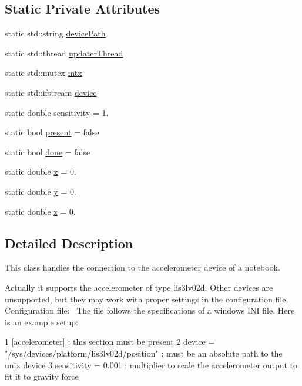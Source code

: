 \subsection*{Static Private Attributes}
\begin{DoxyCompactItemize}
\item 
static std\+::string \hyperlink{classAccelerometer_acb0857fa75bff055f25584ae24d362d4}{device\+Path}
\item 
static std\+::thread \hyperlink{classAccelerometer_a8b9d7d942de3ac41f6fe2b2c7e3f15e8}{updater\+Thread}
\item 
static std\+::mutex \hyperlink{classAccelerometer_aa5e00cbce6850be9d3083530bff709dd}{mtx}
\item 
static std\+::ifstream \hyperlink{classAccelerometer_adde7ddf4ba2fae34b4a0910f1a64076b}{device}
\item 
static double \hyperlink{classAccelerometer_a6c600b26e7eeb394058515e8481c8ae0}{sensitivity} = 1.
\item 
static bool \hyperlink{classAccelerometer_a3a11a04b74460eb6ddcf79af3a35e33b}{present} = false
\item 
static bool \hyperlink{classAccelerometer_abe36590009a1913b6886427fc110f531}{done} = false
\item 
static double \hyperlink{classAccelerometer_af06011557497aa4603cbe47966f32aaf}{x} = 0.
\item 
static double \hyperlink{classAccelerometer_a4cba3b73c6339058c046baf1659595fc}{y} = 0.
\item 
static double \hyperlink{classAccelerometer_ac11a92cc27528e883bbfe04cf4a150f7}{z} = 0.
\end{DoxyCompactItemize}


\subsection{Detailed Description}
This class handles the connection to the accelerometer device of a notebook.

Actually it supports the accelerometer of type lis3lv02d. Other devices are unsupported, but they may work with proper settings in the configuration file.~\newline
~\newline
Configuration file\+:~\newline
The file follows the specifications of a windows I\+N\+I file. Here is an example setup\+: 
\begin{DoxyCode}
1 [accelerometer] ; this section must be present
2 device = "/sys/devices/platform/lis3lv02d/position" ; must be an absolute path to the unix device
3 sensitivity = 0.001 ; multiplier to scale the accelerometer output to fit it to gravity force
\end{DoxyCode}
 

